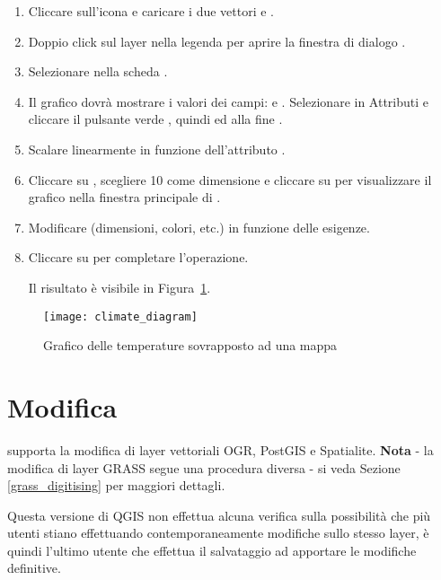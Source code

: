 \begin{enumerate}
\item Cliccare sull'icona  e 
caricare i due vettori  e .
\item Doppio click sul layer  nella legenda per aprire la finestra di dialogo 
.
\item Selezionare  nella scheda .
\item Il grafico dovrà mostrare i valori dei campi:
 e . Selezionare
 in Attributi e cliccare il pulsante verde \button{+}, quindi
 ed alla fine .
\item Scalare linearmente in funzione dell'attributo .
\item Cliccare su , scegliere 10 come dimensione e cliccare 
su  per visualizzare il grafico nella finestra principale di \qg.
\item Modificare (dimensioni, colori, etc.) in funzione delle esigenze.
\item Cliccare su  per completare l'operazione.

Il risultato è visibile in Figura~\ref{fig:climatediagram}.

\end{enumerate}

\begin{figure}
   \centering
   \texttt{[image: climate\_diagram]}
   \caption{Grafico delle temperature sovrapposto ad una mappa \nixcaption}
   \label{fig:climatediagram}
\end{figure}

\section{Modifica}

\qg supporta la modifica di layer vettoriali OGR, PostGIS e Spatialite. 
\textbf{Nota} - la modifica di layer GRASS segue una procedura diversa - 
si veda Sezione \ref{grass_digitising} per maggiori dettagli. 

\begin{Tip}\caption{\textsc{Modifiche concorrenti}}
Questa versione di QGIS non effettua alcuna verifica sulla possibilità che più 
utenti stiano effettuando contemporaneamente modifiche sullo stesso layer, è quindi 
l'ultimo utente che effettua il salvataggio ad apportare le modifiche definitive.
\end{Tip}

